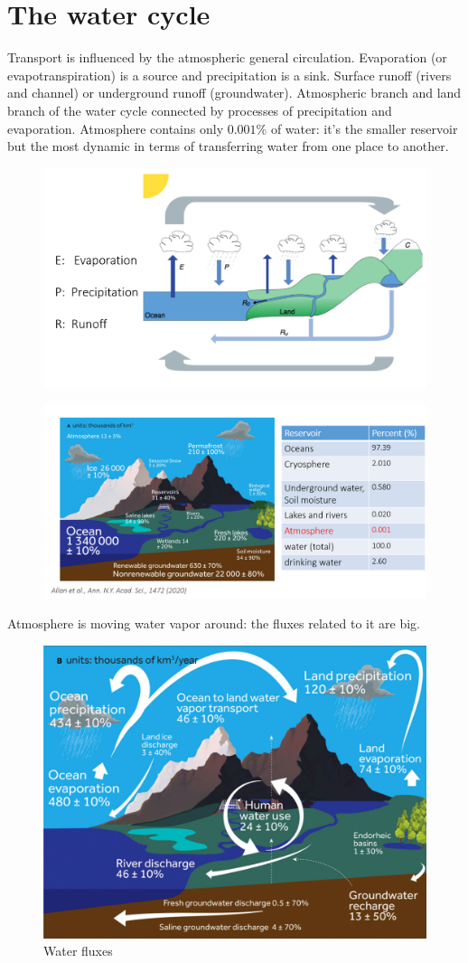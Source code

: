 \section{The water cycle}
Transport is influenced by the atmospheric general circulation. Evaporation (or evapotranspiration) is a source and precipitation is a sink. Surface runoff (rivers and channel) or underground runoff (groundwater). Atmospheric branch and land branch of the water cycle connected by processes of precipitation and evaporation. Atmosphere contains only $0.001$\% of water: it's the smaller reservoir but the most dynamic in terms of transferring water from one place to another.
\begin{figure}[htpb]
    \centering
    \includegraphics[width=0.5\linewidth]{uploads/water cycle.png}
\end{figure}
\begin{figure}[htpb]
    \centering
    \includegraphics[width=0.5\linewidth]{uploads/water content.png}
\end{figure}
Atmosphere is moving water vapor around: the fluxes related to it are big.
\begin{figure}[htpb]
    \centering
    \includegraphics[width=0.5\linewidth]{uploads/water fluxes.png}
    \caption{Water fluxes}
    \label{fig:water fluxes}
\end{figure}
